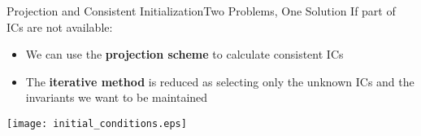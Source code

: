\begin{frame}{Projection and Consistent Initialization}{Two Problems, One Solution}
  If part of ICs are not available:
  \begin{itemize}
    \item We can use the \textbf{projection scheme} to calculate consistent ICs
    \item The \textbf{iterative method} is reduced as selecting only the unknown ICs and the invariants we want to be maintained
  \end{itemize}
  \centering\texttt{[image: initial\_conditions.eps]}
\end{frame}


